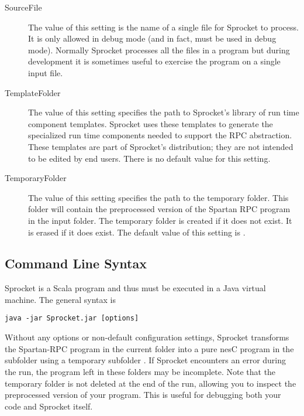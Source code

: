 \begin{description}
\item[SourceFile] The value of this setting is the name of a single file for Sprocket to
  process. It is only allowed in debug mode (and in fact, must be used in debug mode). Normally
  Sprocket processes all the files in a program but during development it is sometimes useful to
  exercise the program on a single input file.

\item[TemplateFolder] The value of this setting specifies the path to Sprocket's library of run
  time component templates. Sprocket uses these templates to generate the specialized run time
  components needed to support the RPC abstraction. These templates are part of Sprocket's
  distribution; they are not intended to be edited by end users. There is no default value for
  this setting.

\item[TemporaryFolder] The value of this setting specifies the path to the temporary folder.
  This folder will contain the preprocessed version of the Spartan RPC program in the input
  folder. The temporary folder is created if it does not exist. It is erased if it does exist.
  The default value of this setting is .

\end{description}

\subsection{Command Line Syntax}

Sprocket is a Scala program and thus must be executed in a Java virtual machine. The general
syntax is
\begin{verbatim}
java -jar Sprocket.jar [options]
\end{verbatim}

Without any options or non-default configuration settings, Sprocket transforms the Spartan-RPC
program in the current folder into a pure nesC program in the subfolder 
using a temporary subfolder . If Sprocket encounters an error during the
run, the program left in these folders may be incomplete. Note that the temporary folder is not
deleted at the end of the run, allowing you to inspect the preprocessed version of your program.
This is useful for debugging both your code and Sprocket itself.

